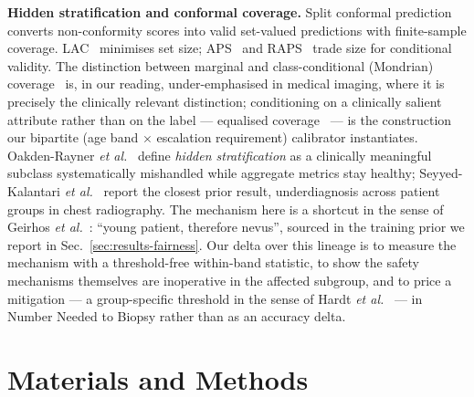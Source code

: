 \documentclass[journal]{IEEEtran}
\begin{document}
\textbf{Hidden stratification and conformal coverage.} Split conformal
prediction~\cite{vovk2005algorithmic} converts non-conformity scores into valid set-valued
predictions with finite-sample coverage. LAC~\cite{sadinle2019lac} minimises set size;
APS~\cite{romano2020aps} and RAPS~\cite{angelopoulos2021raps} trade size for conditional
validity. The distinction between marginal and class-conditional (Mondrian)
coverage~\cite{vovk2012conditional} is, in our reading, under-emphasised in medical imaging,
where it is precisely the clinically relevant distinction; conditioning on a clinically
salient attribute rather than on the label --- equalised
coverage~\cite{romano2020equalized} --- is the construction our bipartite (age band
$\times$ escalation requirement) calibrator instantiates. Oakden-Rayner \emph{et
al.}~\cite{oakdenrayner2020hidden} define \emph{hidden stratification} as a clinically
meaningful subclass systematically mishandled while aggregate metrics stay healthy;
Seyyed-Kalantari \emph{et al.}~\cite{seyyedkalantari2021underdiagnosis} report the closest
prior result, underdiagnosis across patient groups in chest radiography. The mechanism here is
a shortcut in the sense of Geirhos \emph{et al.}~\cite{geirhos2020shortcut}: ``young patient,
therefore nevus'', sourced in the training prior we report in
Sec.~\ref{sec:results-fairness}. Our delta over this lineage is to measure the mechanism with a
threshold-free within-band statistic, to show the safety mechanisms themselves are inoperative
in the affected subgroup, and to price a mitigation --- a group-specific threshold in the
sense of Hardt \emph{et al.}~\cite{hardt2016equality} --- in Number Needed to Biopsy rather
than as an accuracy delta.

\section{Materials and Methods}
\label{sec:methods}
\end{document}
